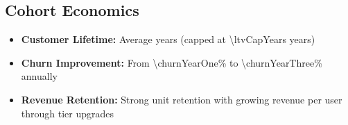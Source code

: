 \subsection{Cohort Economics}
\begin{itemize}
    \item \textbf{Customer Lifetime:} Average  years (capped at \num{\ltvCapYears} years)
    \item \textbf{Churn Improvement:} From \num{\churnYearOne}\% to \num{\churnYearThree}\% annually
    \item \textbf{Revenue Retention:} Strong unit retention with growing revenue per user through tier upgrades
\end{itemize}